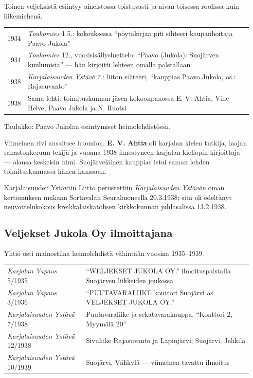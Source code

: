 \documentclass[10pt,a4paper]{article}
\begin{document}
Toinen veljeksistä esiintyy aineistossa toistuvasti ja aivan toisessa roolissa kuin
liikemiehenä.

\begin{center}
\begin{tabularx}{\linewidth}{@{}lX@{}}
\toprule
1934 & \emph{Toukomies} 1.5.: kokouksessa ``pöytäkirjaa piti sihteeri kaupanhoitaja Paavo Jukola'' \\
1934 & \emph{Toukomies} 12., vuosisisällysluettelo: ``Paavo (Jukola): Suojärven kuulumisia'' --- hän kirjoitti lehteen omalla palstallaan \\
1938 & \emph{Karjalaisuuden Ystävä} 7.: liiton sihteeri, ``kauppias Paavo Jukola, os.: Rajasuvanto'' \\
1938 & Sama lehti: toimituskunnan jäsen kokoonpanossa E. V. Ahtia, Ville Helve, Paavo Jukola ja N. Ruotsi \\
\bottomrule
\end{tabularx}
\end{center}

{\footnotesize Taulukko: Paavo Jukolan esiintymiset heimolehdistössä.}

Viimeinen rivi ansaitsee huomion. \textbf{E. V. Ahtia} oli karjalan kielen tutkija,
laajan sanastonkeruun tekijä ja vuonna 1938 ilmestyneen karjalan kieliopin kirjoittaja
--- alansa keskeisin nimi. Suojärveläinen kauppias istui saman lehden toimituskunnassa
hänen kanssaan.

Karjalaisuuden Ystäväin Liitto perustettiin \emph{Karjalaisuuden Ystävän} oman
kertomuksen mukaan Sortavalan Seurahuoneella 20.3.1938; sitä oli edeltänyt
neuvottelukokous kreikkalaiskatolisen kirkkokunnan juhlasalissa 13.2.1938.

\subsection{Veljekset Jukola Oy ilmoittajana}

Yhtiö osti mainostilaa heimolehdistä vähintään vuosina 1935--1939.

\begin{center}
\begin{tabularx}{\linewidth}{@{}lX@{}}
\toprule
\emph{Karjalan Vapaus} 5/1935 & ``WELJEKSET JUKOLA OY.'' ilmoituspalstalla Suojärven liikkeiden joukossa \\
\emph{Karjalan Vapaus} 3/1936 & ``PUUTAVARALIIKE konttori Suojärvi as. VELJEKSET JUKOLA OY.'' \\
\emph{Karjalaisuuden Ystävä} 7/1938 & Puutavaraliike ja sekatavarakauppa; ``Konttori 2, Myymälä 20'' \\
\emph{Karjalaisuuden Ystävä} 12/1938 & Sivuliike Rajasuvanto ja Lapinjärvi; Suojärvi, Jehkilä \\
\emph{Karjalaisuuden Ystävä} 10/1939 & Suojärvi, Välikylä --- viimeinen tavattu ilmoitus \\
\bottomrule
\end{tabularx}
\end{center}
\end{document}
